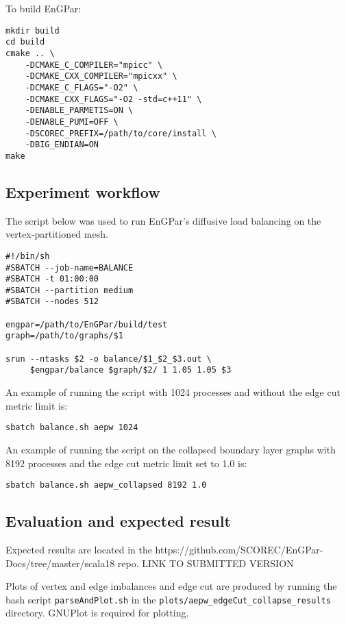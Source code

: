 To build EnGPar:
\begin{lstlisting}
mkdir build
cd build
cmake .. \
    -DCMAKE_C_COMPILER="mpicc" \
    -DCMAKE_CXX_COMPILER="mpicxx" \
    -DCMAKE_C_FLAGS="-O2" \
    -DCMAKE_CXX_FLAGS="-O2 -std=c++11" \
    -DENABLE_PARMETIS=ON \
    -DENABLE_PUMI=OFF \
    -DSCOREC_PREFIX=/path/to/core/install \
    -DBIG_ENDIAN=ON
make
\end{lstlisting}

\subsection{Experiment workflow}

The script below was used to run EnGPar's diffusive load balancing on the vertex-partitioned mesh.
\begin{lstlisting}
#!/bin/sh
#SBATCH --job-name=BALANCE
#SBATCH -t 01:00:00
#SBATCH --partition medium
#SBATCH --nodes 512

engpar=/path/to/EnGPar/build/test
graph=/path/to/graphs/$1

srun --ntasks $2 -o balance/$1_$2_$3.out \
     $engpar/balance $graph/$2/ 1 1.05 1.05 $3
\end{lstlisting}
An example of running the script with 1024 processes and without the edge cut metric limit is:
\begin{lstlisting}
sbatch balance.sh aepw 1024
\end{lstlisting}
An example of running the script on the collapsed boundary layer graphs with 8192 processes and the edge cut metric limit set to 1.0 is:
\begin{lstlisting}
sbatch balance.sh aepw_collapsed 8192 1.0
\end{lstlisting}

\subsection{Evaluation and expected result}

Expected results are located in the 
https://github.com/SCOREC/EnGPar-Docs/tree/master/scala18
repo.
{\color{red} LINK TO SUBMITTED VERSION}

Plots of vertex and edge imbalances and edge cut are produced by
running the bash script \texttt{parseAndPlot.sh} in the
\texttt{plots/aepw\_edgeCut\_collapse\_results} directory.
GNUPlot is required for plotting.

